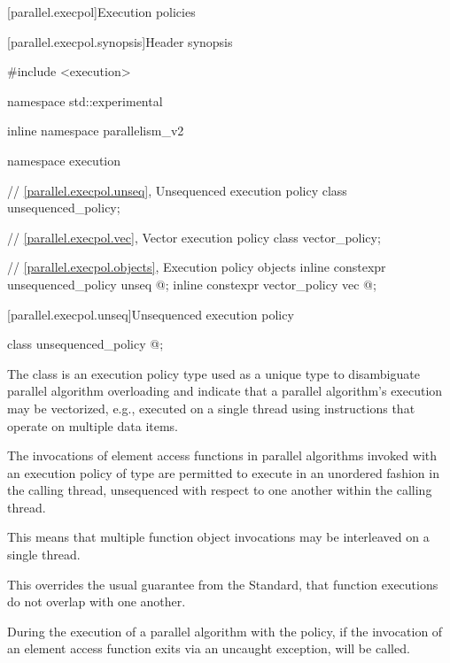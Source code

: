 
[parallel.execpol]{Execution policies}

[parallel.execpol.synopsis]{Header  synopsis}

\begin{codeblock}
#include <execution>

namespace std::experimental {
inline namespace parallelism_v2 {
namespace execution {
  // \ref{parallel.execpol.unseq}, Unsequenced execution policy
  class unsequenced_policy;

  // \ref{parallel.execpol.vec}, Vector execution policy
  class vector_policy;

  // \ref{parallel.execpol.objects}, Execution policy objects
  inline constexpr unsequenced_policy unseq{ @\unspec@ };
  inline constexpr vector_policy vec{ @\unspec@ };
}
}
}
\end{codeblock}

[parallel.execpol.unseq]{Unsequenced execution policy}

\begin{itemdecl}
class unsequenced_policy{ @\unspec@ };
\end{itemdecl}

\pnum
The class  is an execution policy type used as
a unique type to disambiguate parallel algorithm overloading and indicate that
a parallel algorithm's execution may be vectorized, e.g., executed on a single
thread using instructions that operate on multiple data items.

\pnum
The invocations of element access functions in parallel algorithms
invoked with an execution policy of type  are
permitted to execute in an unordered fashion in the calling thread, unsequenced
with respect to one another within the calling thread. \begin{note}This means
that multiple function object invocations may be interleaved on a single
thread.\end{note}

\pnum
\begin{note}
  This overrides the usual guarantee from the \Cpp Standard,  that function executions do not overlap with one another.
\end{note}

\pnum
During the execution of a parallel algorithm with the  policy, if the invocation of an element access function exits via an uncaught exception,  will be called.

